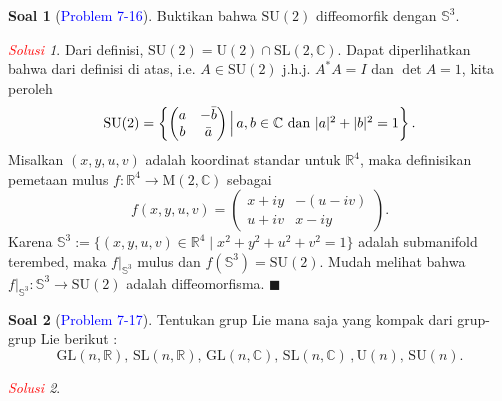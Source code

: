 \documentclass[11pt]{article}
\theoremstyle{definition}
\newtheorem*{problem}{Soal}
\theoremstyle{remark}
\newtheorem*{solution}{\textcolor{red}{Solusi}}
\newcommand{\er}{\mathbb{R}}            %
\newcommand{\C}{\mathbb{C}}             %
\newcommand{\GL}{\text{GL}}                 %
\newcommand{\GLnr}{\text{GL}(n,\mathbb{R})} %
\begin{document}
\begin{problem}[\textcolor{blue}{Problem 7-16}] 
Buktikan bahwa $\text{SU}(2)$ diffeomorfik dengan $\mathbb{S}^3$.
\end{problem}
\begin{solution}
Dari definisi, $\text{SU}(2) = \text{U}(2) \cap \text{SL}(2,\C)$. Dapat diperlihatkan bahwa dari definisi di atas, i.e. $A \in \text{SU}(2)$ j.h.j. $A^*A=I$ dan $\det A=1$, kita peroleh
$$
\text{SU}(2) = 
    \begin{Bmatrix}
        \begin{pmatrix} 
        a & -\Bar{b} \\
        b & \Bar{a} 
        \end{pmatrix} 
        \Big| \, a,b \in \C \text{ dan } |a|^2+|b|^2 = 1 
    \end{Bmatrix}.
$$
Misalkan $(x,y,u,v)$ adalah koordinat standar untuk $\er^4$, maka definisikan pemetaan mulus $f : \er^4 \to \text{M}(2,\C)$ sebagai 
$$
f(x,y,u,v) = \begin{pmatrix} x+iy & -(u-iv) \\ u+iv & x-iy \end{pmatrix}.
$$
Karena $\mathbb{S}^3 := \{(x,y,u,v) \in \er^4 \mid x^2+y^2+u^2+v^2=1 \}$ adalah submanifold terembed, maka $f|_{\mathbb{S}^3}$ mulus dan $f(\mathbb{S}^3) = \text{SU}(2)$. Mudah melihat bahwa $f|_{\mathbb{S}^3} : \mathbb{S}^3 \to \text{SU}(2)$ adalah diffeomorfisma. $\blacksquare$
\end{solution}

\begin{problem}[\textcolor{blue}{Problem 7-17}] 
Tentukan grup Lie mana saja yang kompak dari grup-grup Lie berikut :
$$
\GLnr,\,  \text{SL}(n,\er), \, \GL(n,\mathbb{C}), \, \text{SL}(n,\mathbb{C})\, , \text{U}(n), \, \text{SU}(n).
$$
\end{problem}
\begin{solution}

\end{solution}
\end{document}
